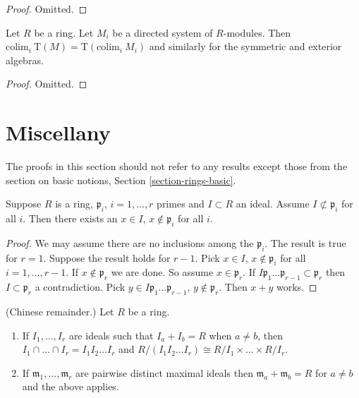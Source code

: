 \begin{proof}
Omitted.
\end{proof}

\begin{lemma}
\label{lemma-colimit-tensor-algebra}
Let $R$ be a ring. Let $M_i$ be a directed system of
$R$-modules. Then
$\text{colim}_i\ \text{T}(M) = \text{T}(\text{colim}_i\ M_i)$
and similarly for the symmetric and exterior algebras.
\end{lemma}

\begin{proof}
Omitted.
\end{proof}
















\section{Miscellany}
\label{section-miscellany}

\noindent
The proofs in this section should not refer to any results except
those from the section on basic notions, Section \ref{section-rings-basic}.

\begin{lemma}
\label{lemma-silly}
Suppose $R$ is a ring, $\mathfrak p_i$, $i = 1, \ldots, r$ primes
and $I \subset R$ an ideal. Assume $I \not\subset \mathfrak p_i$
for all $i$. Then there exists an $x\in I$, $x\not\in \mathfrak p_i$ for
all $i$.
\end{lemma}

\begin{proof}
We may assume there are no inclusions among the $\mathfrak p_i$.
The result is true for $r = 1$.
Suppose the result holds for $r-1$.
Pick $x \in I$, $x \not \in \mathfrak p_i$ for all $i = 1, \ldots, r-1$.
If $x \not\in \mathfrak p_r$ we are done. So assume $x \in \mathfrak p_r$.
If $I\mathfrak p_1 \ldots \mathfrak p_{r-1} \subset \mathfrak p_r$
then $I \subset \mathfrak p_r$ a contradiction.
Pick $y \in I\mathfrak p_1 \ldots \mathfrak p_{r-1}$,
$y \not \in \mathfrak p_r$. Then $x + y$ works.
\end{proof}

\begin{lemma}
\label{lemma-chinese-remainder}
(Chinese remainder.)
Let $R$ be a ring.
\begin{enumerate}
\item If $I_1, \ldots, I_r$ are ideals such that $I_a + I_b = R$
when $a \not = b$, then $I_1 \cap \ldots \cap I_r =
I_1I_2\ldots I_r$ and $R/(I_1I_2\ldots I_r)
\cong R/I_1 \times \ldots \times R/I_r$.
\item If $\mathfrak m_1, \ldots, \mathfrak m_r$ are pairwise distinct maximal
ideals then $\mathfrak m_a + \mathfrak m_b = R$ for $a \not = b$ and the
above applies.
\end{enumerate}
\end{lemma}

